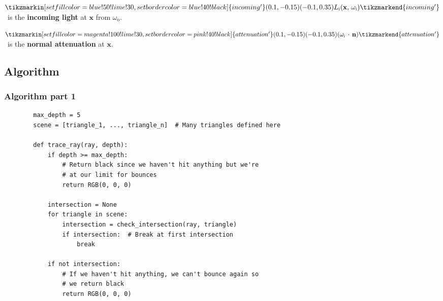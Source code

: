 \documentclass{beamer}
\begin{document}
\begin{frame}
\(
    \tikzmarkin[set fill color=blue!50!lime!30,set border color=blue!40!black]{incoming'}(0.1,-0.15)(-0.1,0.35)
        L_{\text{i}}(\mathbf x,\, \omega_{\text{i}})
    \tikzmarkend{incoming'}
\)\, is the \textbf{incoming light} at \(\mathbf x\) from \(\omega_{\text{o}}\).
\pause

\smallskip
\(
    \tikzmarkin[set fill color=magenta!100!lime!30,set border color=pink!40!black]{attenuation'}(0.1,-0.15)(-0.1,0.35)
        (\omega_{\text{i}}\,\cdot\,\mathbf n)
    \tikzmarkend{attenuation'}
\)\, is the \textbf{normal attenuation} at \(\mathbf x\).
\end{frame}

\subsection{Algorithm}
\begin{frame}[fragile]
    \frametitle{Algorithm part 1}
    \scriptsize
    \begin{verbatim}
        max_depth = 5
        scene = [triangle_1, ..., triangle_n]  # Many triangles defined here

        def trace_ray(ray, depth):
            if depth >= max_depth:
                # Return black since we haven't hit anything but we're
                # at our limit for bounces
                return RGB(0, 0, 0) 

            intersection = None
            for triangle in scene:
                intersection = check_intersection(ray, triangle)
                if intersection:  # Break at first intersection
                    break

            if not intersection:
                # If we haven't hit anything, we can't bounce again so
                # we return black
                return RGB(0, 0, 0)
    \end{verbatim}
\end{frame}
\end{document}
